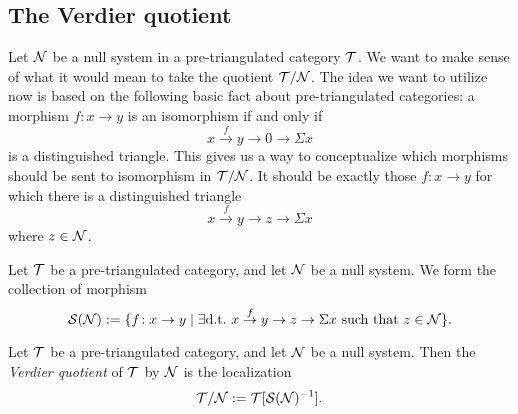 \subsection{The Verdier quotient}
Let \(\mathcal{N}\) be a null system in a pre-triangulated category \(\mathcal{T}\). We want to make sense of what it would mean to take the quotient \(\mathcal{T}/\mathcal{N}\). The idea we want to utilize now is based
on the following basic fact about pre-triangulated categories: a morphism \(f\!:x\to y\) is an isomorphism if and only if
\[ x\overset{f}\to y\to 0 \to \Sigma x \]
is a distinguished triangle. This gives us a way to conceptualize which morphisms should be sent to isomorphism in \(\mathcal{T}/\mathcal{N}\). It should be exactly those \(f\!:x\to y\) for which there
is a distinguished triangle
\[ x\overset{f}\to y\to z \to \Sigma x \]
where \(z\in\mathcal{N}\).
\begin{notation}
	Let \(\mathcal{T}\) be a pre-triangulated category, and let \(\mathcal{N}\) be a null system. We form the collection of morphism
	\[ \mathcal{S}(\mathcal{N}) := \{ f\!:x\to y\mid \exists\text{d.t.\ } x\overset{f}\to y\to z \to \Sigma x\text{ such that }z\in\mathcal{N} \}. \]
\end{notation}
\begin{definition}
	Let \(\mathcal{T}\) be a pre-triangulated category, and let \(\mathcal{N}\) be a null system. Then the \emph{Verdier quotient} of \(\mathcal{T}\) by \(\mathcal{N}\) is the localization
	\[ \mathcal{T}/\mathcal{N} := \mathcal{T}[\mathcal{S}(\mathcal{N})^{-1}]. \]
\end{definition}

